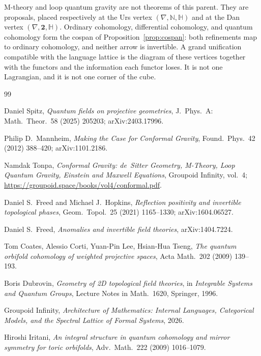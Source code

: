 \documentclass{article}
\theoremstyle{definition}
\begin{document}
M-theory and loop quantum gravity are not theorems of this parent.  They are
proposals, placed respectively at the Urs vertex \((\nabla,\mathbb{N},\mathbb{H})\)
and at the Dan vertex \((\nabla,\mathbf{2},\mathbb{H})\).  Ordinary
cohomology, differential cohomology, and quantum cohomology form the cospan
of Proposition~\ref{prop:cospan}: both refinements map to ordinary cohomology,
and neither arrow is invertible.  A grand unification compatible with
the language lattice is the diagram of these vertices together with the
functors and the information each functor loses.  It is not one Lagrangian,
and it is not one corner of the cube.

\begin{thebibliography}{99}

Daniel Spitz,
\emph{Quantum fields on projective geometries},
J.\ Phys.\ A: Math.\ Theor.\ 58 (2025) 205203;
arXiv:2403.17996.

Philip D.\ Mannheim,
\emph{Making the Case for Conformal Gravity},
Found.\ Phys.\ 42 (2012) 388--420;
arXiv:1101.2186.

Namdak Tonpa,
\emph{Conformal Gravity: de~Sitter Geometry, M-Theory, Loop Quantum Gravity,
Einstein and Maxwell Equations},
Groupoid Infinity, vol.~4;
\url{https://groupoid.space/books/vol4/conformal.pdf}.

Daniel S.\ Freed and Michael J.\ Hopkins,
\emph{Reflection positivity and invertible topological phases},
Geom.\ Topol.\ 25 (2021) 1165--1330;
arXiv:1604.06527.

Daniel S.\ Freed,
\emph{Anomalies and invertible field theories},
arXiv:1404.7224.

Tom Coates, Alessio Corti, Yuan-Pin Lee, Hsian-Hua Tseng,
\emph{The quantum orbifold cohomology of weighted projective spaces},
Acta Math.\ 202 (2009) 139--193.

Boris Dubrovin,
\emph{Geometry of 2D topological field theories},
in \emph{Integrable Systems and Quantum Groups},
Lecture Notes in Math.\ 1620, Springer, 1996.

Groupoid Infinity,
\emph{Architecture of Mathematics: Internal Languages, Categorical Models,
and the Spectral Lattice of Formal Systems},
2026.

Hiroshi Iritani,
\emph{An integral structure in quantum cohomology and mirror symmetry
for toric orbifolds},
Adv.\ Math.\ 222 (2009) 1016--1079.


\end{thebibliography}
\end{document}
